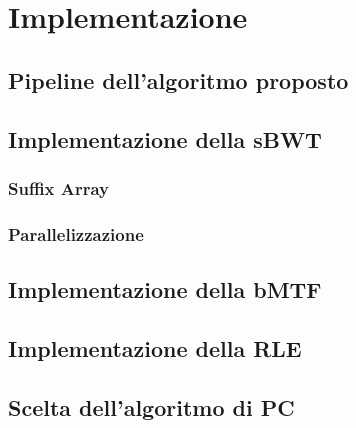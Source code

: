 \chapter{Implementazione} %
%

\begin{citazione}
\end{citazione}
\newpage

\section{Pipeline dell'algoritmo proposto} 
\section{Implementazione della sBWT}
\subsection{Suffix Array}
\subsection{Parallelizzazione}
\section{Implementazione della bMTF} 
\section{Implementazione della RLE} 
\section{Scelta dell'algoritmo di PC} 
